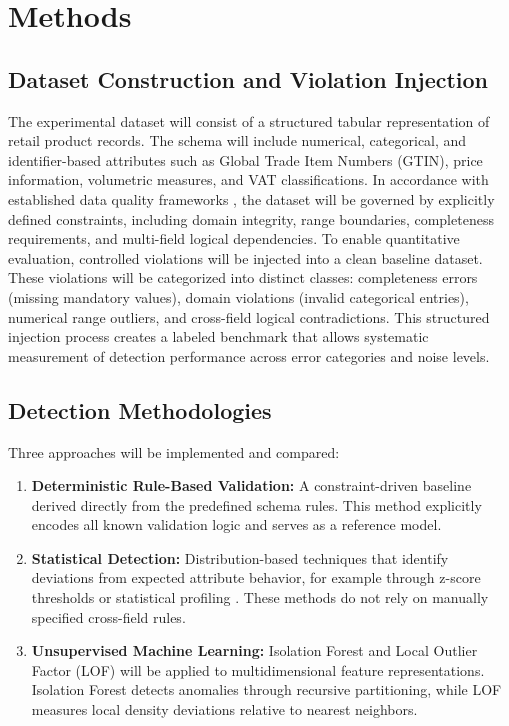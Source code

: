 \documentclass[a4paper, 12pt]{article} %
\begin{document}
\section{Methods}
\subsection{Dataset Construction and Violation Injection}
The experimental dataset will consist of a structured tabular representation of retail product records. The schema will include numerical, categorical, and identifier-based attributes such as Global Trade Item Numbers (GTIN), price information, volumetric measures, and VAT classifications. In accordance with established data quality frameworks \cite{rahm2000data, fan2008dependencies}, the dataset will be governed by explicitly defined constraints, including domain integrity, range boundaries, completeness requirements, and multi-field logical dependencies.
To enable quantitative evaluation, controlled violations will be injected into a clean baseline dataset. These violations will be categorized into distinct classes: completeness errors (missing mandatory values), domain violations (invalid categorical entries), numerical range outliers, and cross-field logical contradictions. This structured injection process creates a labeled benchmark that allows systematic measurement of detection performance across error categories and noise levels.
\subsection{Detection Methodologies}
Three approaches will be implemented and compared:
\begin{enumerate}
    \item \textbf{Deterministic Rule-Based Validation:} A constraint-driven baseline derived directly from the predefined schema rules. This method explicitly encodes all known validation logic and serves as a reference model.

    \item \textbf{Statistical Detection:} Distribution-based techniques that identify deviations from expected attribute behavior, for example through z-score thresholds or statistical profiling \cite{aggarwal2017outlier}. These methods do not rely on manually specified cross-field rules.

    \item \textbf{Unsupervised Machine Learning:} Isolation Forest \cite{liu2008isolation} and Local Outlier Factor (LOF) \cite{breunig2000lof} will be applied to multidimensional feature representations. Isolation Forest detects anomalies through recursive partitioning, while LOF measures local density deviations relative to nearest neighbors.
\end{enumerate}
\end{document}
